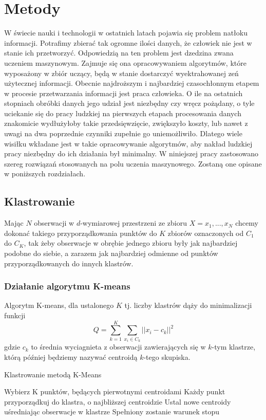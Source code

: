 \documentclass{article}
\begin{document}
\section{Metody}
W świecie nauki i technologii w ostatnich latach pojawia się problem natłoku informacji.
Potrafimy zbierać tak ogromne ilości danych, że człowiek nie jest w stanie ich przetworzyć.
Odpowiedzią na ten problem jest dzedzina zwana uczeniem maszynowym. 
Zajmuje się ona opracowywaniem algorytmów, które wyposażony w zbiór uczący, będą w stanie dostarczyć wyektrahowanej zeń użytecznej informacji.
Obecnie najdroższym i najbardziej czasochłonnym etapem w procesie przetwarzania informacji jest praca człowieka.
O ile na ostatnich stopniach obróbki danych jego udział jest niezbędny czy wręcz pożądany, o tyle uciekanie się do pracy ludzkiej na pierwszych etapach procesowania danych znakomicie wydłużyłoby takie przedsięwzięcie, zwiększyło koszty, lub nawet z uwagi na dwa poprzednie czynniki zupełnie go uniemożliwiło.
Dlatego wiele wisiłku wkładane jest w takie opracowywanie algorytmów, aby nakład ludzkiej pracy niezbędny do ich działania był minimalny.
W niniejszej pracy zastosowano szereg rozwiązań stosowanych na polu uczenia maszynowego.
Zostaną one opisane w poniższych rozdziałach.
\subsection{Klastrowanie}
Mając \(N\) obserwacji w \(d\)-wymiarowej przestrzeni ze zbioru \(X = {x_1, ..., x_N}\) chcemy dokonać takiego przyporządkowania punktów do \(K\) zbiorów oznaczonych od \(C_1\) do \(C_K\), tak żeby obserwacje w obrębie jednego zbioru były jak najbardziej podobne do siebie, a zarazem jak najbardziej odmienne od punktów przyporządkowanych do innych klastrów.\
\subsubsection{Działanie algorytmu K-means}
Algorytm K-means, dla ustalonego \(K\) tj. liczby klastrów dąży do minimalizacji funkcji 
\[Q = \sum\limits^K_{k=1}\sum\limits_{x_i \in C_k} ||x_i - c_k||^2\]
gdzie \(c_k\) to średnia wyciagnieta z obserwacji zawierających się w \(k\)-tym klastrze, którą później będziemy nazywać centroidą $k$-tego skupiska.

\begin{algorithm}
\label{class_kmeans_alg}
\caption{Klastrowanie metodą K-Means}
\begin{algorithmic}[1]
\STATE Wybierz K punktów, będących pierwotnymi centroidami
\REPEAT
\STATE Każdy punkt przyporządkuj do klastra, o najbliższej centroidzie
\STATE Ustal nowe centroidy uśredniając obserwacje w klastrze
\UNTIL Spełniony zostanie warunek stopu
\end{algorithmic}
\end{algorithm}	
\end{document}
